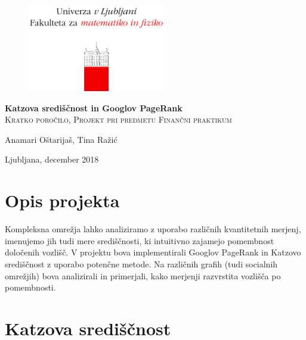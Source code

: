 \documentclass[a4paper]{article}
\begin{document}
\thispagestyle{empty}

\begin{figure}[t]
\begin{center} 
\includegraphics[width=6cm]{fmf.png}\\[4cm]
\end{center}
\end{figure}

\begin{center}
\Huge\textbf{Katzova središčnost in Googlov PageRank}\\[0.5cm]
\large\textsc{Kratko poročilo, Projekt pri predmetu Finančni praktikum}\\[4cm]
\end{center}

\begin{flushleft}

\end{flushleft}
\vspace{\fill}
\begin{flushright}
Anamari Oštarijaš, Tina Ražić
\end{flushright}

\begin{flushleft}
Ljubljana, december 2018
\end{flushleft}

\newpage
\section{Opis projekta}
\hspace{4.8mm}Kompleksna omrežja lahko analiziramo z uporabo različnih kvantitetnih merjenj, imenujemo jih tudi mere središčnosti,  ki intuitivno zajamejo pomembnost določenih vozlišč. 
V projektu bova implementirali Googlov PageRank in Katzovo središčnost z uporabo potenčne metode. Na različnih grafih (tudi socialnih omrežjih) bova analizirali in primerjali, kako merjenji razvrstita vozlišča po pomembnosti. 

\section{Katzova središčnost}
\end{document}
